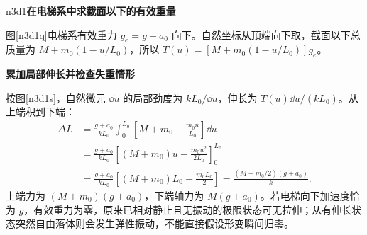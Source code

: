 \LectureAnswerSection

\begin{drillsolution}{n3d1}\textbf{在电梯系中求截面以下的有效重量}\par\nobreak
图\ref{n3d1q}电梯系有效重力 $g_e=g+a_0$ 向下。自然坐标从顶端向下取，截面以下总质量为 $M+m_0(1-u/L_0)$，所以 $T(u)=[M+m_0(1-u/L_0)]g_e$。


\par\medskip{}\noindent\textbf{累加局部伸长并检查失重情形}\par\nobreak
按图\ref{n3d1s}，自然微元 $\dd u$ 的局部劲度为 $kL_0/\dd u$，伸长为 $T(u)\dd u/(kL_0)$。从上端积到下端：
\begin{align*}
\Delta L&=\frac{g+a_0}{kL_0}\int_0^{L_0}
\left[M+m_0-\frac{m_0u}{L_0}\right]\dd u\\
&=\frac{g+a_0}{kL_0}
\left[(M+m_0)u-\frac{m_0u^2}{2L_0}\right]_0^{L_0}\\
&=\frac{g+a_0}{kL_0}
 \left[(M+m_0)L_0-\frac{m_0L_0}{2}\right]
=\frac{(M+m_0/2)(g+a_0)}k.
\end{align*}
上端力为 $(M+m_0)(g+a_0)$，下端轴力为 $M(g+a_0)$。若电梯向下加速度恰为 $g$，有效重力为零，原来已相对静止且无振动的极限状态可无拉伸；从有伸长状态突然自由落体则会发生弹性振动，不能直接假设形变瞬间归零。
\end{drillsolution}

